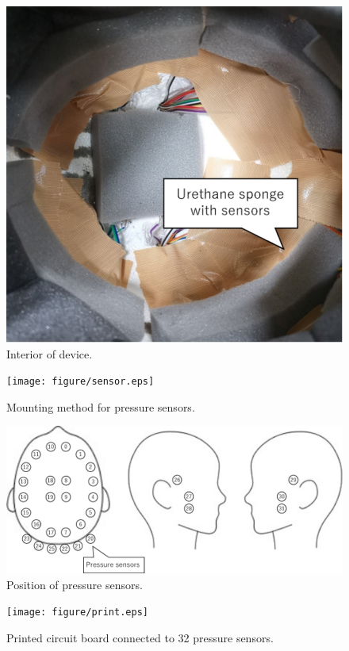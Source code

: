 \documentclass[sigchi,authordraft]{acmart}
\begin{document}
\begin{figure}[!t]
  \begin{center}
    \includegraphics[width=0.6\linewidth]{figure/met_in.eps}
  \end{center}
  \caption{Interior of device.}
  \label{fig:met_in}
\end{figure}

\begin{figure}[!t]
  \begin{center}
    \texttt{[image: figure/sensor.eps]}
  \end{center}
  \caption{Mounting method for pressure sensors.}
  \label{fig:sensor}
\end{figure}

\begin{figure}[!t]
  \begin{center}
    \includegraphics[width=1\linewidth]{figure/position.eps}
  \end{center}
  \caption{Position of pressure sensors.}
  \label{fig:position}
\end{figure}

\begin{figure}[!t]
  \begin{center}
    \texttt{[image: figure/print.eps]}
  \end{center}
  \caption{Printed circuit board connected to 32 pressure sensors.}
  \label{fig:print}
\end{figure}
\end{document}
